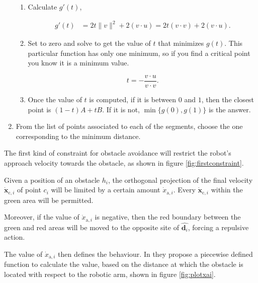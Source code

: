 \begin{enumerate}
\begin{enumerate}
        \item Calculate $g'(t)$,

        \begin{align}
        g'(t) & = 2t \|v\|^2  + 2 (v \cdot u) = 2t (v \cdot v)  + 2 (v \cdot u).
        \end{align}

        \item Set to zero and solve to get the value of $t$ that minimizes $g(t)$. This particular function has only one minimum, so if you find a critical point you know it is a minimum value.

        $$
        t = -\frac{v \cdot u}{v \cdot v}.
        $$

        \item Once the value of $t$ is computed, if it is between $0$ and $1$, then the closest point is $(1-t)A + t B$. If it is not, $\min\{g(0),g(1)\}$ is the answer.
    \end{enumerate}

    \item From the list of points associated to each of the segments, choose the one corresponding to the minimum distance.
\end{enumerate}

The first kind of constraint for obstacle avoidance will restrict the robot's approach velocity towards the obstacle, as shown in figure \ref{fig:firstconstraint}.

Given a position of an obstacle $h_i$, the orthogonal projection of the final velocity $\dot{\mathbf{x}}_{\mathrm{c}, i}$ of point $c_i$ will be limited by a certain amount $\dot{x}_{\mathrm{a}, i}$. Every $\dot{\mathbf{x}}_{\mathrm{c}, i}$ within the green area will be permitted.

Moreover, if the value of $\dot{x}_{\mathrm{a}, i}$ is negative, then the red boundary between the green and red areas will be moved to the opposite site of $\hat{\mathbf{d}_i}$, forcing a repulsive action.

The value of $\dot{x}_{\mathrm{a}, i}$ then defines the behaviour. In \cite{dingcollision} they propose a piecewise defined function to calculate the value, based on the distance at which the obstacle is located with respect to the robotic arm, shown in figure \ref{fig:plotxai}.

